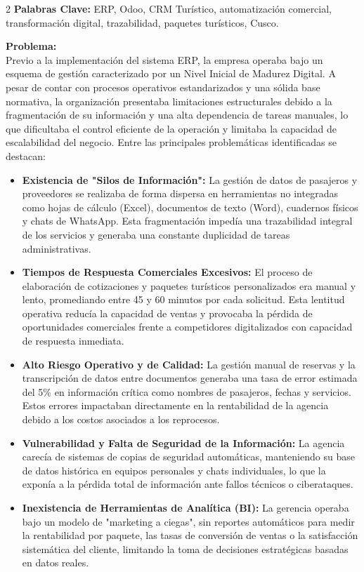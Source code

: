 \documentclass[12pt]{article}
\begin{document}
\newpage
\begin{multicols}{2}
\textbf{Palabras Clave:} ERP, Odoo, CRM Turístico, automatización comercial, transformación digital, trazabilidad, paquetes turísticos, Cusco.

\textbf{Problema:}\\
Previo a la implementación del sistema ERP, la empresa operaba bajo un esquema de gestión caracterizado por un Nivel Inicial de Madurez Digital. A pesar de contar con procesos operativos estandarizados y una sólida base normativa, la organización presentaba limitaciones estructurales debido a la fragmentación de su información y una alta dependencia de tareas manuales, lo que dificultaba el control eficiente de la operación y limitaba la capacidad de escalabilidad del negocio. Entre las principales problemáticas identificadas se destacan:
\begin{itemize}
    \item \textbf{Existencia de "Silos de Información":} La gestión de datos de pasajeros y proveedores se realizaba de forma dispersa en herramientas no integradas como hojas de cálculo (Excel), documentos de texto (Word), cuadernos físicos y chats de WhatsApp. Esta fragmentación impedía una trazabilidad integral de los servicios y generaba una constante duplicidad de tareas administrativas.
    \item \textbf{Tiempos de Respuesta Comerciales Excesivos:} El proceso de elaboración de cotizaciones y paquetes turísticos personalizados era manual y lento, promediando entre 45 y 60 minutos por cada solicitud. Esta lentitud operativa reducía la capacidad de ventas y provocaba la pérdida de oportunidades comerciales frente a competidores digitalizados con capacidad de respuesta inmediata.
    \item \textbf{Alto Riesgo Operativo y de Calidad:} La gestión manual de reservas y la transcripción de datos entre documentos generaba una tasa de error estimada del 5\% en información crítica como nombres de pasajeros, fechas y servicios. Estos errores impactaban directamente en la rentabilidad de la agencia debido a los costos asociados a los reprocesos.
    \item \textbf{Vulnerabilidad y Falta de Seguridad de la Información:} La agencia carecía de sistemas de copias de seguridad automáticas, manteniendo su base de datos histórica en equipos personales y chats individuales, lo que la exponía a la pérdida total de información ante fallos técnicos o ciberataques.
    \item \textbf{Inexistencia de Herramientas de Analítica (BI):} La gerencia operaba bajo un modelo de "marketing a ciegas", sin reportes automáticos para medir la rentabilidad por paquete, las tasas de conversión de ventas o la satisfacción sistemática del cliente, limitando la toma de decisiones estratégicas basadas en datos reales.
\end{itemize}


\end{multicols}
\end{document}

